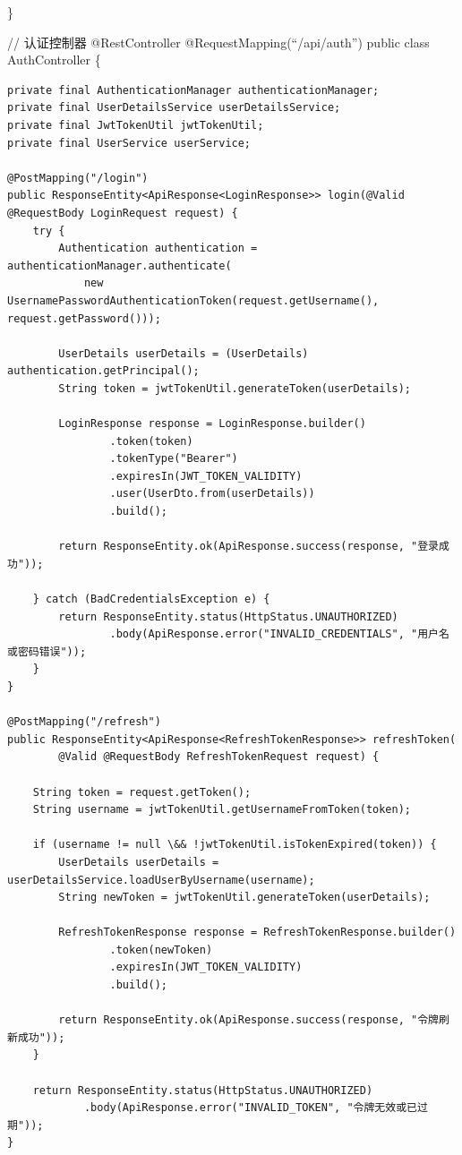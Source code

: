 \}

// 认证控制器 @RestController @RequestMapping(``/api/auth'') public class AuthController \{

\begin{verbatim}
private final AuthenticationManager authenticationManager;
private final UserDetailsService userDetailsService;
private final JwtTokenUtil jwtTokenUtil;
private final UserService userService;

@PostMapping("/login")
public ResponseEntity<ApiResponse<LoginResponse>> login(@Valid @RequestBody LoginRequest request) {
    try {
        Authentication authentication = authenticationManager.authenticate(
            new UsernamePasswordAuthenticationToken(request.getUsername(), request.getPassword()));
            
        UserDetails userDetails = (UserDetails) authentication.getPrincipal();
        String token = jwtTokenUtil.generateToken(userDetails);
        
        LoginResponse response = LoginResponse.builder()
                .token(token)
                .tokenType("Bearer")
                .expiresIn(JWT_TOKEN_VALIDITY)
                .user(UserDto.from(userDetails))
                .build();
                
        return ResponseEntity.ok(ApiResponse.success(response, "登录成功"));
        
    } catch (BadCredentialsException e) {
        return ResponseEntity.status(HttpStatus.UNAUTHORIZED)
                .body(ApiResponse.error("INVALID_CREDENTIALS", "用户名或密码错误"));
    }
}

@PostMapping("/refresh")
public ResponseEntity<ApiResponse<RefreshTokenResponse>> refreshToken(
        @Valid @RequestBody RefreshTokenRequest request) {
    
    String token = request.getToken();
    String username = jwtTokenUtil.getUsernameFromToken(token);
    
    if (username != null \&& !jwtTokenUtil.isTokenExpired(token)) {
        UserDetails userDetails = userDetailsService.loadUserByUsername(username);
        String newToken = jwtTokenUtil.generateToken(userDetails);
        
        RefreshTokenResponse response = RefreshTokenResponse.builder()
                .token(newToken)
                .expiresIn(JWT_TOKEN_VALIDITY)
                .build();
                
        return ResponseEntity.ok(ApiResponse.success(response, "令牌刷新成功"));
    }
    
    return ResponseEntity.status(HttpStatus.UNAUTHORIZED)
            .body(ApiResponse.error("INVALID_TOKEN", "令牌无效或已过期"));
}
\end{verbatim}

